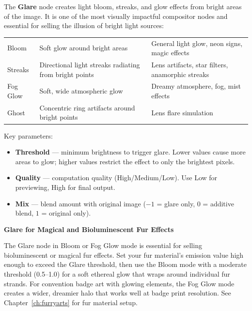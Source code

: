 The \textbf{Glare} node creates light bloom, streaks, and glow effects from bright areas of the image. It is one of the most visually impactful compositor nodes and essential for selling the illusion of bright light sources:

\vspace{0.5em}
\begin{tabularx}{\textwidth}{l L{3cm} X}
\toprule
{}
 &  &  \\
\midrule
Bloom & Soft glow around bright areas & General light glow, neon signs, magic effects \\
Streaks & Directional light streaks radiating from bright points & Lens artifacts, star filters, anamorphic streaks \\
Fog Glow & Soft, wide atmospheric glow & Dreamy atmosphere, fog, mist effects \\
Ghost & Concentric ring artifacts around bright points & Lens flare simulation \\
\bottomrule
\end{tabularx}
\vspace{0.5em}

Key parameters:
\begin{itemize}[leftmargin=2em]
  \item \textbf{Threshold} --- minimum brightness to trigger glare. Lower values cause more areas to glow; higher values restrict the effect to only the brightest pixels.
  \item \textbf{Quality} --- computation quality (High/Medium/Low). Use Low for previewing, High for final output.
  \item \textbf{Mix} --- blend amount with original image ($-1$ = glare only, $0$ = additive blend, $1$ = original only).
\end{itemize}

\begin{furrybox}
\textbf{Glare for Magical and Bioluminescent Fur Effects}

The Glare node in Bloom or Fog Glow mode is essential for selling bioluminescent or magical fur effects. Set your fur material's emission value high enough to exceed the Glare threshold, then use the Bloom mode with a moderate threshold (0.5--1.0) for a soft ethereal glow that wraps around individual fur strands. For convention badge art with glowing elements, the Fog Glow mode creates a wider, dreamier halo that works well at badge print resolution. See Chapter~\ref{ch:furryarts} for fur material setup.
\end{furrybox}

